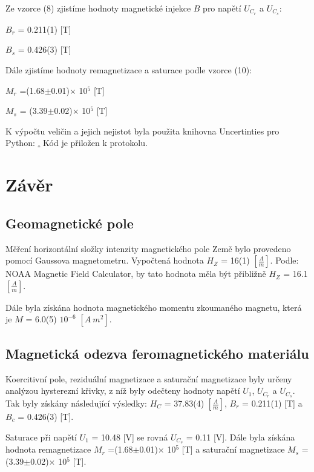 \documentclass[a4paper,11pt]{article}
\begin{document}
    \begin{minipage}[t]{0.5\textwidth}
            Ze vzorce (8) zjistíme hodnoty magnetické injekce $B$ pro napětí $U_C_r$ a $U_C_s$:
            \begin{center}
                $B_r$ = 0.211(1) [T]
                \vspace{5pt}
                \par $B_s$ = 0.426(3) [T]
            \end{center}
            Dále zjistíme hodnoty remagnetizace a saturace podle vzorce (10): 
            \begin{center}
                $M_r$ =(1.68$\pm$0.01)$\times$ 10$^5$ [T]
                \vspace{5pt}
                \par $M_s$ = (3.39$\pm$0.02)$\times$ 10$^5$ [T]  
            \end{center}
            K výpočtu veličin a jejich nejistot byla použita knihovna Uncertinties pro Python: \href{pypi.org/project/uncertainties}. Kód je přiložen k protokolu. 
\section{Závěr}
        \subsection{Geomagnetické pole}
            Měření horizontální složky intenzity magnetického pole Země bylo provedeno pomocí Gaussova magnetometru. Vypočtená hodnota $H_Z$ = 16(1) $\left[\frac{A}{m} \right]$. Podle: NOAA Magnetic Field Calculator, by tato hodnota měla být přibližně $H_Z$ = 16.1 $\left[\frac{A}{m} \right]$.
            \par Dále byla získána hodnota magnetického momentu zkoumaného magnetu, která je $M$ = 6.0(5) $10^{-6}$ $\left[A ~ m^2 \right]$.
        \subsection{Magnetická odezva feromagnetického materiálu}
            Koercitivní pole, reziduální magnetizace a saturační magnetizace byly určeny analýzou hysterezní křivky, z níž byly odečteny hodnoty napětí $U_1$, $U_C_r$ a $U_C_s$. Tak byly získány následující výsledky: $H_C$ = 37.83(4) $\left[ \frac{A}{m} \right]$, $B_r$ = 0.211(1) [T] a $B_c$ = 0.426(3) [T].
            \par Saturace při napětí $U_1$ = 10.48 [V] se rovná $U_C_s$ = 0.11 [V]. Dále byla získána hodnota remagnetizace $M_r$ =(1.68$\pm$0.01)$\times$ 10$^5$ [T] a saturační magnetizace $M_s$ = (3.39$\pm$0.02)$\times$ 10$^5$ [T].
    \end{minipage}
\end{document}
